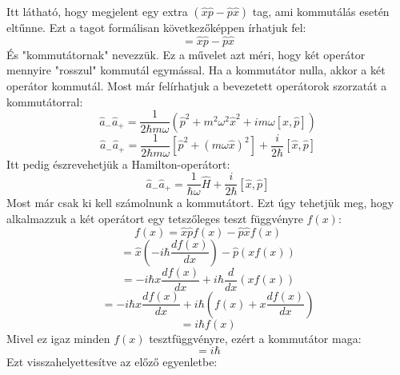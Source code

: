\documentclass[../main.tex]{subfiles}
\begin{document}
Itt látható, hogy megjelent egy extra $(\hat{x} \hat{p} - \hat{p} \hat{x})$ tag, ami kommutálás esetén eltűnne.
Ezt a tagot formálisan következőképpen írhatjuk fel:
\begin{equation}
    [\hat{x}, \hat{p}] = \hat{x} \hat{p} - \hat{p} \hat{x}
\end{equation}
És "kommutátornak" nevezzük. Ez a művelet azt méri, hogy két operátor mennyire "rosszul" kommutál egymással. Ha a kommutátor nulla, akkor a két operátor kommutál.
Most már felírhatjuk a bevezetett operátorok szorzatát a kommutátorral:
\begin{equation}
    \hat{a}_- \hat{a}_+ = \frac{1}{2 \hbar m \omega} \left( \hat{p}^2 + m^2 \omega^2 \hat{x}^2 + i m \omega [\hat{x}, \hat{p}] \right)
\end{equation}
\begin{equation}
    \hat{a}_- \hat{a}_+ = \frac{1}{2 \hbar m \omega} \left[\hat{p}^2 + (m \omega \hat{x})^2\right] + \frac{i}{2 \hbar} [\hat{x}, \hat{p}]
\end{equation}
Itt pedig észrevehetjük a Hamilton-operátort:
\begin{equation}
    \hat{a}_- \hat{a}_+ = \frac{1}{\hbar \omega} \hat{H} + \frac{i}{2 \hbar} [\hat{x}, \hat{p}]
\end{equation}
Most már csak ki kell számolnunk a kommutátort. Ezt úgy tehetjük meg, hogy alkalmazzuk a két operátort egy tetszőleges teszt függvényre $f(x)$:
\begin{equation}
    [\hat{x}, \hat{p}] f(x) = \hat{x} \hat{p} f(x) - \hat{p} \hat{x} f(x)
\end{equation}
\begin{equation}
    = \hat{x} \left( - i \hbar \frac{d f(x)}{dx} \right) - \hat{p} \left( x f(x) \right)
\end{equation}
\begin{equation}
    = - i \hbar x \frac{d f(x)}{dx} + i \hbar \frac{d}{dx} \left( x f(x) \right)
\end{equation}
\begin{equation}
    = - i \hbar x \frac{d f(x)}{dx} + i \hbar \left( f(x) + x \frac{d f(x)}{dx} \right)
\end{equation}
\begin{equation}
    = i \hbar f(x)
\end{equation}
Mivel ez igaz minden $f(x)$ tesztfüggvényre, ezért a kommutátor maga:
\begin{equation}
    [\hat{x}, \hat{p}] = i \hbar
\end{equation}
Ezt visszahelyettesítve az előző egyenletbe:
\end{document}
